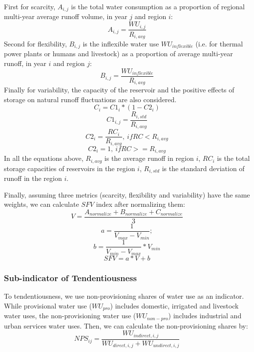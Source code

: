 \documentclass[9pt, twocolumn, twoside, lineno]{pnas-new}
\begin{document}
{	First for scarcity, $A_{i, j}$ is the total water consumption as a proportion of regional multi-year average runoff volume, in year $j$ and region $i$:
	$$ A_{i, j} = \frac{WU_{i,j}}{R_{i, avg}} $$
	Second for flexibility, $B_{i, j}$ is the inflexible water use $WU_{inflexible}$ (i.e. for thermal power plants or humans and livestock) as a proportion of average multi-year runoff, in year $i$ and region $j$:
	$$ B_{i, j} = \frac{WU_{inflexible}}{R_{i, avg}} $$
	Finally for variability, the capacity of the reservoir and the positive effects of storage on natural runoff fluctuations are also considered.
	$$ C_i = C1_i * (1 - C2_i) $$
	$$ C1_{i, j} = \frac{R_{i, std}}{R_{i, avg}} $$
	$$ C2_{i} = \frac{RC_{i}}{R_{i, avg}}, \ if RC < R_{i, avg} $$
	$$ C2_{i} = 1, \ if RC >= R_{i, avg} $$
	In all the equations above, $R_{i, avg}$ is the average runoff in region $i$, $RC_i$ is the total storage capacities of reservoirs in the region $i$, $R_{i, std}$ is the standard deviation of runoff in the region $i$.

	Finally, assuming three metrics (scarcity, flexibility and variability) have the same weights, we can calculate $SFV$ index after normalizing them:
	$$ V = \frac{A_{normalize} + B_{normalize} + C_{normalize}}{3} $$
	$$ a = \frac{1}{V_{max} - V_{min}}; $$
	$$ b = \frac{1}{V_{min} - V_{max}} * V_{min} $$
	$$ SFV = a * V + b $$

	\subsubsection*{Sub-indicator of Tendentiousness}
	To tendentiousness, we use non-provisioning shares of water use as an indicator. While provisional water use ($WU_{pro}$) includes domestic, irrigated and livestock water uses, the non-provisioning water use ($WU_{non-pro}$) includes industrial and urban services water uses. Then, we can calculate the non-provisioning shares by:
	$$ NPS_{ij} = \frac{WU_{indirect, i, j}}{WU_{direct, i, j} + WU_{undirect, i, j}} $$

}
\end{document}
